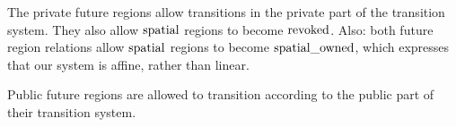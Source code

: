 \documentclass[a4paper]{article}
\begin{document}
%
The private future regions allow transitions in the private part of the transition system. They also allow $\mathrm{spatial}$ regions to become $\mathrm{revoked}$.
Also: both future region relations allow $\mathrm{spatial}$ regions to become $\mathrm{spatial\_owned}$, which expresses that our system is affine, rather than linear.
%
Public future regions are allowed to transition according to the public part of their transition system.
\end{document}
